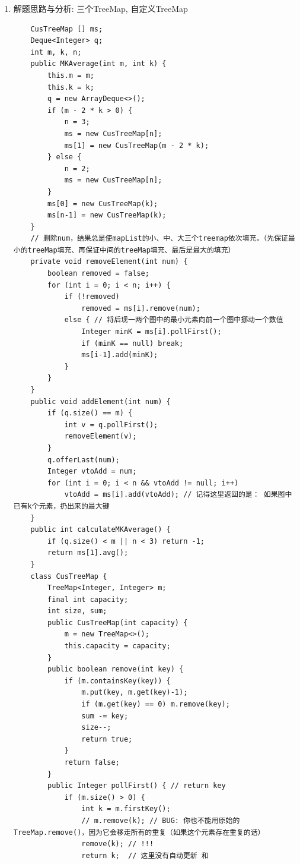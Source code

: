 \documentclass[9pt, b5paaper]{book}
\begin{document}
\begin{enumerate}
\item 解题思路与分析: 三个TreeMap, 自定义TreeMap
\label{sec-1-0-2-1}
\begin{verbatim}
    CusTreeMap [] ms;
    Deque<Integer> q;
    int m, k, n;
    public MKAverage(int m, int k) {
        this.m = m;
        this.k = k;
        q = new ArrayDeque<>();
        if (m - 2 * k > 0) {
            n = 3;
            ms = new CusTreeMap[n];
            ms[1] = new CusTreeMap(m - 2 * k);
        } else {
            n = 2;
            ms = new CusTreeMap[n];
        }
        ms[0] = new CusTreeMap(k);
        ms[n-1] = new CusTreeMap(k);
    }
    // 删除num，结果总是使mapList的小、中、大三个treemap依次填充。（先保证最小的treeMap填充、再保证中间的treeMap填充、最后是最大的填充）
    private void removeElement(int num) {
        boolean removed = false;
        for (int i = 0; i < n; i++) {
            if (!removed)
                removed = ms[i].remove(num);
            else { // 将后现一两个图中的最小元素向前一个图中挪动一个数值
                Integer minK = ms[i].pollFirst();
                if (minK == null) break;
                ms[i-1].add(minK);
            }
        }
    }
    public void addElement(int num) {
        if (q.size() == m) {
            int v = q.pollFirst();
            removeElement(v);
        }
        q.offerLast(num);
        Integer vtoAdd = num;
        for (int i = 0; i < n && vtoAdd != null; i++) 
            vtoAdd = ms[i].add(vtoAdd); // 记得这里返回的是： 如果图中已有k个元素，扔出来的最大键
    }
    public int calculateMKAverage() {
        if (q.size() < m || n < 3) return -1;
        return ms[1].avg();
    }
    class CusTreeMap {
        TreeMap<Integer, Integer> m;
        final int capacity;
        int size, sum;
        public CusTreeMap(int capacity) {
            m = new TreeMap<>();
            this.capacity = capacity;
        }
        public boolean remove(int key) {
            if (m.containsKey(key)) {
                m.put(key, m.get(key)-1);
                if (m.get(key) == 0) m.remove(key);
                sum -= key;
                size--;
                return true;
            }
            return false;
        }
        public Integer pollFirst() { // return key
            if (m.size() > 0) {
                int k = m.firstKey();
                // m.remove(k); // BUG: 你也不能用原始的TreeMap.remove()，因为它会移走所有的重复（如果这个元素存在重复的话）
                remove(k); // !!!
                return k;  // 这里没有自动更新 和 

\end{verbatim}
\end{enumerate}
\end{document}
